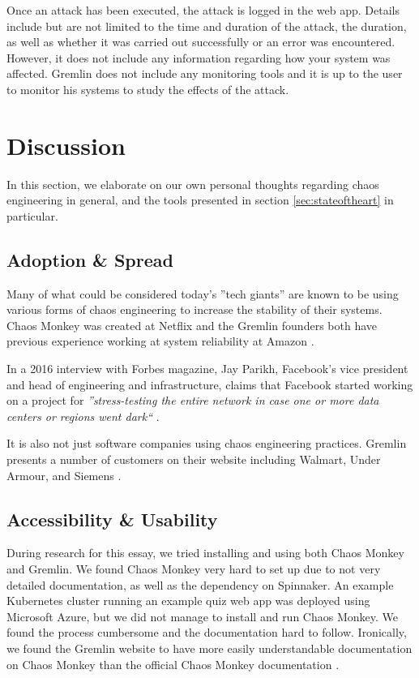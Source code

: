 \documentclass{article}
\begin{document}
Once an attack has been executed, the attack is logged in the web app. Details include but are not limited to the time and duration of the attack, the duration, as well as whether it was carried out successfully or an error was encountered. However, it does not include any information regarding how your system was affected. Gremlin does not include any monitoring tools and it is up to the user to monitor his systems to study the effects of the attack.

\section{Discussion}
\label{sec:discussion}

In this section, we elaborate on our own personal thoughts regarding chaos engineering in general, and the tools presented in section \ref{sec:stateoftheart} in particular.

\subsection{Adoption \& Spread}
Many of what could be considered today's ''tech giants'' are known to be using various forms of chaos engineering to increase the stability of their systems. Chaos Monkey was created at Netflix and the Gremlin founders both have previous experience working at system reliability at Amazon \cite{gremlinAbout}.

In a 2016 interview with Forbes magazine, Jay Parikh, Facebook’s vice president and head of engineering and infrastructure, claims that Facebook started working on a project for \textit{''stress-testing the entire network in case one or more data centers or regions went dark``} \cite{forbes}.

It is also not just software companies using chaos engineering practices. Gremlin presents a number of customers on their website including Walmart, Under Armour, and Siemens \cite{gremlin}.

\subsection{Accessibility \& Usability}
During research for this essay, we tried installing and using both Chaos Monkey and Gremlin. We found Chaos Monkey very hard to set up due to not very detailed documentation, as well as the dependency on Spinnaker. An example Kubernetes cluster running an example quiz web app was deployed using Microsoft Azure, but we did not manage to install and run Chaos Monkey. We found the process cumbersome and the documentation hard to follow. Ironically, we found the Gremlin website to have more easily understandable documentation on Chaos Monkey than the official Chaos Monkey documentation \cite{chaosMonkeyGuide}.
\end{document}

